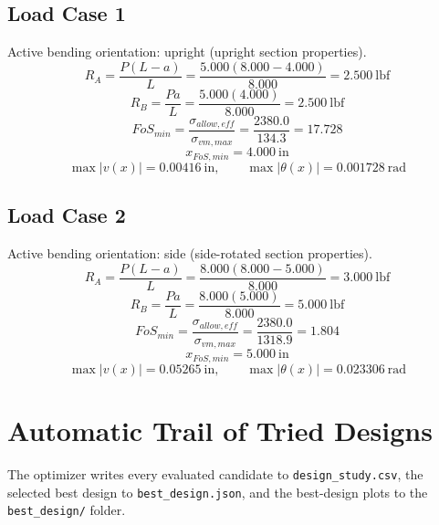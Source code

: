 \documentclass[11pt]{article}
\begin{document}
\subsection*{Load Case 1}
Active bending orientation: upright (upright section properties).
\[R_A = \frac{P(L-a)}{L} = \frac{5.000(8.000-4.000)}{8.000} = 2.500\ \mathrm{lbf}\]
\[R_B = \frac{Pa}{L} = \frac{5.000(4.000)}{8.000} = 2.500\ \mathrm{lbf}\]
\[FoS_{min} = \frac{\sigma_{allow,eff}}{\sigma_{vm,max}} = \frac{2380.0}{134.3} = 17.728\]
\[x_{FoS,min} = 4.000\ \mathrm{in}\]
\[\max |v(x)| = 0.00416\ \mathrm{in}, \qquad \max |\theta(x)| = 0.001728\ \mathrm{rad}\]
\subsection*{Load Case 2}
Active bending orientation: side (side-rotated section properties).
\[R_A = \frac{P(L-a)}{L} = \frac{8.000(8.000-5.000)}{8.000} = 3.000\ \mathrm{lbf}\]
\[R_B = \frac{Pa}{L} = \frac{8.000(5.000)}{8.000} = 5.000\ \mathrm{lbf}\]
\[FoS_{min} = \frac{\sigma_{allow,eff}}{\sigma_{vm,max}} = \frac{2380.0}{1318.9} = 1.804\]
\[x_{FoS,min} = 5.000\ \mathrm{in}\]
\[\max |v(x)| = 0.05265\ \mathrm{in}, \qquad \max |\theta(x)| = 0.023306\ \mathrm{rad}\]

\section*{Automatic Trail of Tried Designs}
The optimizer writes every evaluated candidate to \texttt{design\_study.csv}, the selected best design to \texttt{best\_design.json}, and the best-design plots to the \texttt{best\_design/} folder.
\end{document}
